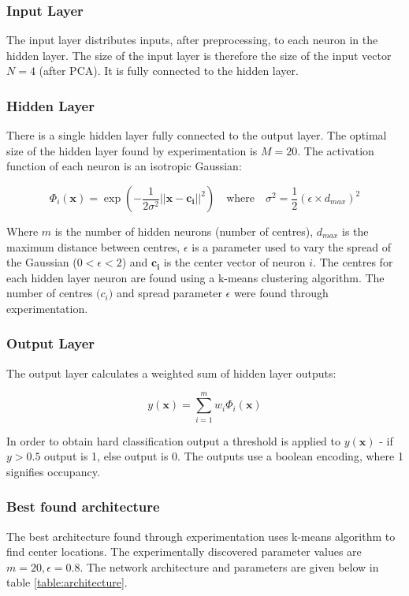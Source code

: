 \documentclass[a4paper, 11pt]{article}
\begin{document}
\subsubsection{Input Layer}
The input layer distributes inputs, after preprocessing, to each neuron in the hidden layer. The size of the input layer is therefore the size of the input vector $N=4$ (after PCA). It is fully connected to the hidden layer.

\subsubsection{Hidden Layer}
There is a single hidden layer fully connected to the output layer. The optimal size of the hidden layer found by experimentation is $M=20$. The activation function of each neuron is an isotropic Gaussian:

\begin{equation}
\Phi_i(\boldsymbol{x}) = \exp\left(-\frac{1}{2\sigma^2} \lvert\lvert \boldsymbol{x} -  \boldsymbol{c_i} \rvert\rvert ^2\right)
\quad \mathrm{where }\quad
\sigma^2 = \frac{1}{2}(\epsilon \times d_{max})^2
\label{eq:rbf}
\end{equation}

Where $m$ is the number of hidden neurons (number of centres), $d_{max}$ is the maximum distance between centres, $\epsilon$ is a parameter used to vary the spread of the Gaussian ($0<\epsilon<2$) and $\boldsymbol{c_i}$ is the center vector of neuron $i$. The centres for each hidden layer neuron are found using a k-means clustering algorithm. The number of centres $\boldsymbol(c_i)$ and spread parameter $\epsilon$ were found through experimentation.

\subsubsection{Output Layer}
The output layer calculates a weighted sum of hidden layer outputs:

\begin{equation}
y(\boldsymbol{x}) = \displaystyle\sum_{i=1}^{m} w_i \Phi_i(\boldsymbol{x})
\end{equation}

In order to obtain hard classification output a threshold is applied to $y(\boldsymbol{x})$ - if $y>0.5$ output is 1, else output is 0. The outputs use a boolean encoding, where 1 signifies occupancy.

\subsubsection{Best found architecture}
The best architecture found through experimentation uses k-means algorithm to find center locations. The experimentally discovered parameter values are $m = 20, \epsilon = 0.8$. The network architecture and parameters are given below in table \ref{table:architecture}.
\end{document}
